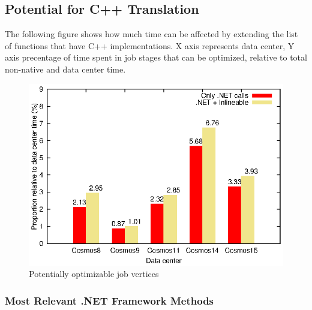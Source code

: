 \subsection{Potential for C++ Translation}

The following figure shows how much time can be affected by extending the list of functions that have C++ implementations. X axis represents data center, Y axis precentage of time spent in job stages that can be optimized, relative to total non-native and data center time.

\begin{figure}[ht]
\includegraphics[scale=0.8]{graphs/potentiallyOptimizable}

\caption{Potentially optimizable job vertices}
\end{figure}

\subsubsection{Most Relevant .NET Framework Methods}

